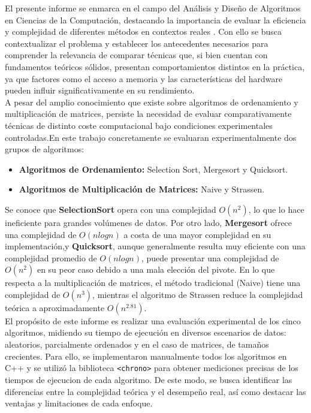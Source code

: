 El presente informe se enmarca en el campo del Análisis y Diseño de Algoritmos en Ciencias de la Computación, destacando la importancia de evaluar la eficiencia y complejidad de diferentes métodos en contextos reales \cite{GoodScientificPaper}. Con ello se busca contextualizar el problema y establecer los antecedentes necesarios para comprender la relevancia de comparar técnicas que, si bien cuentan con fundamentos teóricos sólidos, presentan comportamientos distintos en la práctica, ya que factores como el acceso a memoria y las características del hardware pueden influir significativamente en su rendimiento.\\

A pesar del amplio conocimiento que existe sobre algoritmos de ordenamiento y multiplicación de matrices, persiste la necesidad de evaluar comparativamente técnicas de distinto coste computacional bajo condiciones experimentales controladas.En este trabajo concretamente se evaluaran experimentalmente dos grupos de algoritmos:
\begin{itemize} \item \textbf{Algoritmos de Ordenamiento:} Selection Sort, Mergesort y Quicksort.
\item \textbf{Algoritmos de Multiplicación de Matrices:} Naive y Strassen. \end{itemize}

Se conoce que \textbf{SelectionSort} opera con una complejidad $O(n^2)$, lo que lo hace ineficiente para grandes volúmenes de datos. Por otro lado, \textbf{Mergesort} ofrece una complejidad de 
$O(nlogn)$ a costa de una mayor complejidad en su implementación,y \textbf{Quicksort}, aunque generalmente resulta muy eficiente con una complejidad promedio de $O(nlogn)$, puede presentar una complejidad de $O(n^2)$ en su peor caso debido a una mala elección del pivote. En lo que respecta a la multiplicación de matrices, el método tradicional (Naive) tiene una complejidad de
$O(n^3)$, mientras el algoritmo de Strassen reduce la complejidad teórica a aproximadamente
$O(n^{2.81}).$\\

El propósito de este informe es realizar una evaluación experimental de los cinco algoritmos, midiendo su tiempo de ejecución en diversos escenarios de datos: aleatorios, parcialmente ordenados y en el caso de matrices, de tamaños crecientes. Para ello, se implementaron manualmente todos los algoritmos en C++ y se utilizó la biblioteca \texttt{<chrono>} para obtener mediciones precisas de los tiempos de ejecucion de cada algoritmo. De este modo, se busca identificar las diferencias entre la complejidad teórica y el desempeño real, así como destacar las ventajas y limitaciones de cada enfoque.